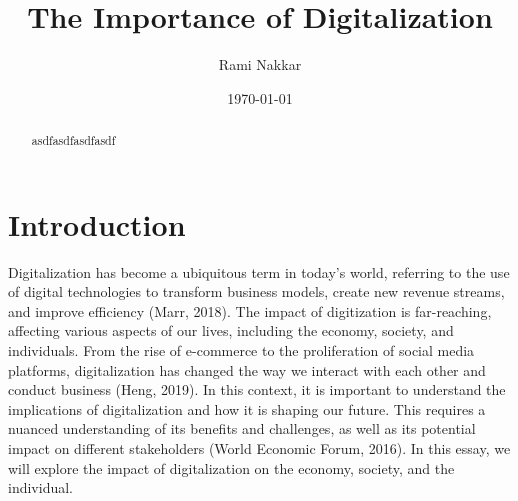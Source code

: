 \documentclass[12pt]{article}
\begin{document}
\onehalfspacing

\title{The Importance of Digitalization}
\author{Rami Nakkar}
\date{\today}
\maketitle

\begin{abstract}
asdfasdfasdfasdf
\end{abstract}

\newpage

\section{Introduction}
Digitalization has become a ubiquitous term in today's world, referring to the use of digital technologies to transform business models, create new revenue streams, and improve efficiency (Marr, 2018). The impact of digitization is far-reaching, affecting various aspects of our lives, including the economy, society, and individuals. From the rise of e-commerce to the proliferation of social media platforms, digitalization has changed the way we interact with each other and conduct business (Heng, 2019). In this context, it is important to understand the implications of digitalization and how it is shaping our future. This requires a nuanced understanding of its benefits and challenges, as well as its potential impact on different stakeholders (World Economic Forum, 2016). In this essay, we will explore the impact of digitalization on the economy, society, and the individual.
\end{document}
